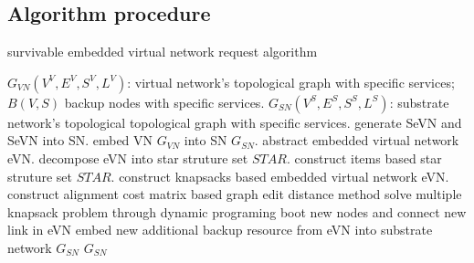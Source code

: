 \subsection{Algorithm procedure}

\begin{algorithm}
\caption{survivable embedded virtual network request algorithm}
\label{alg:SeVNAlg}
\begin{algorithmic}[1]
\REQUIRE $G_{VN}(V^V,E^V,S^V,L^V)$: virtual network's topological graph with specific services; $B(V,S)$ backup nodes with specific services. $G_{SN}(V^S,E^S,S^S,L^S)$: substrate network's topological topological graph with specific services.
\ENSURE generate SeVN and SeVN into SN.
\STATE embed VN $G_{VN}$ into SN $G_{SN}$.
\STATE abstract embedded virtual network eVN.
\STATE decompose eVN into star struture set $STAR$.
\STATE construct items based star struture set $STAR$.
\STATE construct knapsacks based embedded virtual network eVN.
\STATE construct alignment cost matrix based graph edit distance method
\STATE solve multiple knapsack problem through dynamic programing
\STATE boot new nodes and connect new link in eVN
\STATE embed new additional backup resource from eVN into substrate network $G_{SN}$
\ENDFOR
\RETURN $G_{SN}$
\end{algorithmic}
\end{algorithm}





